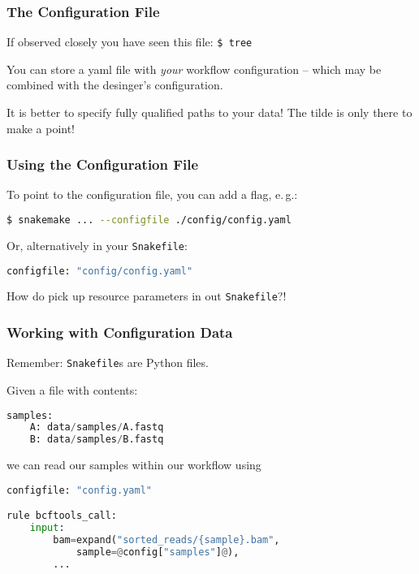 \begin{frame}
  \frametitle{The Configuration File}
  If observed closely you have seen this file:\newline
            {\tiny \DTsetlength{0.2em}{1em}{0.2em}{0.4pt}{.6pt}
\texttt{\$ tree}
}
 \pause
 \begin{docs}
 	You can store a yaml file with \emph{your} workflow configuration -- which may be combined with the desinger's configuration.
 \end{docs}
 \pause
 \begin{warning}
 	It is better to specify fully qualified paths to your data! The tilde is only there to make a point!
 \end{warning}
\end{frame}

\begin{frame}[fragile]
  \frametitle{Using the Configuration File}
  To point to the configuration file, you can add a flag, e.\,g.:
  \begin{lstlisting}[language=Bash, style=Shell]
$ snakemake ... --configfile ./config/config.yaml  
  \end{lstlisting}
  Or, alternatively in your \texttt{Snakefile}:
  \begin{lstlisting}[language=Python,style=Python]
configfile: "config/config.yaml"
  \end{lstlisting}  
  \begin{question}
  	How do pick up resource parameters in out \texttt{Snakefile}?!
  \end{question}
\end{frame} 

\begin{frame}[fragile]
  \frametitle{Working with Configuration Data}
  \begin{hint}
  	Remember: \texttt{Snakefile}s are Python files.
  \end{hint}
  \pause
  Given a file  with contents:
  \begin{lstlisting}[language=Python,style=Python]
samples:
    A: data/samples/A.fastq
    B: data/samples/B.fastq
  \end{lstlisting}
  we can read our samples within our workflow using
  \begin{lstlisting}[language=Python,style=Python]
configfile: "config.yaml"

rule bcftools_call:
    input:
        bam=expand("sorted_reads/{sample}.bam", 
            sample=@config["samples"]@),
        ...
  \end{lstlisting}
\end{frame}


